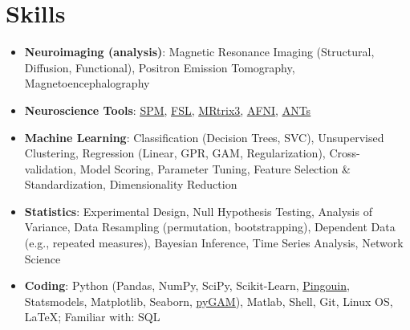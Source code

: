 \documentclass[letterpaper,10pt]{article}
\makeatletter
\newcommand{\resumeSubheading}[4]{
  \vspace{-1pt}\item
    \begin{tabular*}{0.97\textwidth}[t]{l@{\extracolsep{\fill}}r}
      \textbf{#1} & #2 \\
      \textit{\small#3} & \textit{\small #4} \\
    \end{tabular*}\vspace{-5pt}
}
\newcommand{\resumeSubHeadingListStart}{\begin{itemize}[leftmargin=*]}
\newcommand{\resumeSubHeadingListEnd}{\end{itemize}}
\makeatother
\begin{document}
\section{Skills}
 \resumeSubHeadingListStart
   \item{
    \textbf{Neuroimaging (analysis)}{: Magnetic Resonance Imaging (Structural, Diffusion, Functional), Positron Emission Tomography, Magnetoencephalography}
    }
   \item{
    \textbf{Neuroscience Tools}{: \href{https://www.fil.ion.ucl.ac.uk/spm/}{\underline{SPM}}, \href{https://fsl.fmrib.ox.ac.uk/fsl/fslwiki}{\underline{FSL}}, \href{https://www.mrtrix.org/}{\underline{MRtrix3}}, \href{https://afni.nimh.nih.gov/}{\underline{AFNI}}, \href{http://stnava.github.io/ANTs/}{\underline{ANTs}}}
    }
   \item{
    \textbf{Machine Learning}{: Classification (Decision Trees, SVC), Unsupervised Clustering, Regression (Linear, GPR, GAM, Regularization), Cross-validation, Model Scoring, Parameter Tuning, Feature Selection \& Standardization, Dimensionality Reduction}
    }
   \item{
    \textbf{Statistics}{: Experimental Design, Null Hypothesis Testing, Analysis of Variance, Data Resampling (permutation, bootstrapping), Dependent Data (e.g., repeated measures), Bayesian Inference, Time Series Analysis, Network Science}
    }
   \item{
    \textbf{Coding}{: Python (Pandas, NumPy, SciPy, Scikit-Learn, \href{https://pingouin-stats.org/}{\underline{Pingouin}}, Statsmodels, Matplotlib, Seaborn, \href{https://pygam.readthedocs.io/en/latest/}{\underline{pyGAM}}), Matlab, Shell, Git, Linux OS, LaTeX; Familiar with: SQL}
    }
 \resumeSubHeadingListEnd

\end{document}

